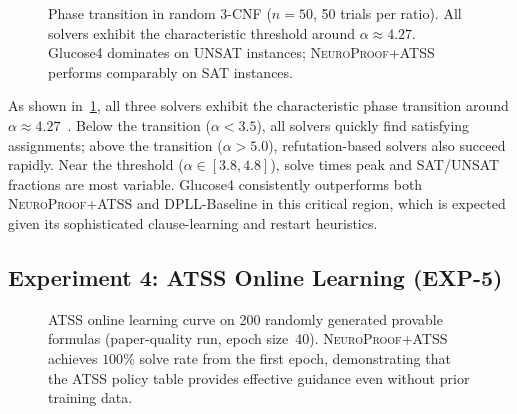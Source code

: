 \documentclass[conference]{IEEEtran}
\newcommand{\NP}{\textsc{NeuroProof}}
\newcommand{\ATSS}{\textsc{ATSS}}
\begin{document}
\begin{figure}[t]
  \centering
  \caption{Phase transition in random 3-CNF ($n=50$, 50 trials
    per ratio).  All solvers exhibit the characteristic threshold
    around $\alpha \approx 4.27$.  Glucose4 dominates on UNSAT
    instances; \NP{}+\ATSS{} performs comparably on SAT instances.}
  \label{fig:phase-transition}
\end{figure}

As shown in~\cref{fig:phase-transition}, all three solvers exhibit
the characteristic phase transition around
$\alpha \approx 4.27$~\cite{Dubois2001}.  Below the transition
($\alpha < 3.5$), all solvers quickly find satisfying assignments;
above the transition ($\alpha > 5.0$), refutation-based solvers
also succeed rapidly.  Near the threshold ($\alpha \in [3.8, 4.8]$),
solve times peak and SAT/UNSAT fractions are most variable.
Glucose4 consistently outperforms both \NP{}+\ATSS{} and DPLL-Baseline
in this critical region, which is expected given its sophisticated
clause-learning and restart heuristics.

\subsection{Experiment 4: ATSS Online Learning \textnormal{(EXP-5)}}

\begin{figure}[t]
  \centering
  \caption{\ATSS{} online learning curve on 200 randomly generated
    provable formulas (paper-quality run, epoch size~40).
    \NP{}+\ATSS{} achieves $100\%$ solve rate from the first epoch,
    demonstrating that the ATSS policy table provides effective
    guidance even without prior training data.}
  \label{fig:atss-learning}
\end{figure}
\end{document}

